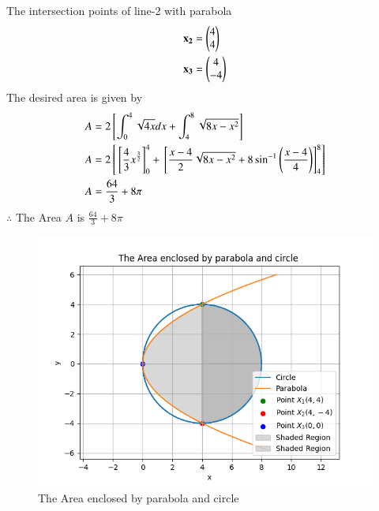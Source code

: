 \documentclass[journal]{IEEEtran}
\begin{document}
The intersection points of line-2 with parabola 
\begin{align}
\mathbf{x_2} &= \begin{pmatrix}4\\4\end{pmatrix}\\
\mathbf{x_3} &= \begin{pmatrix}4\\-4\end{pmatrix}
\end{align}
The desired area is given by 
\begin{align}
    A &= 2{}\left[\int_{0}^{4}\sqrt{4x}dx + \int_{4}^{8}\sqrt{8x - x^2} \right] \\
    A &= 2{}\left[{}\left[\frac{4}{3} x^{\frac{3}{2}}\right]_{0}^{4} + {}\left[\frac{x-4}{2}\sqrt{8x - x^2} + 8 \sin^{-1}\left(\frac{x-4}{4}\right)\right]_4^8 \right]\\
     A &= \frac{64}{3}+ 8 \pi
\end{align}
$\therefore$ The Area $A$ is $\frac{64}{3} + 8\pi$
\begin{figure}[h!]
   \centering
   \includegraphics[width = .8\linewidth]{figs/fig.png}
   \caption{The Area enclosed by parabola and circle}
   \label{stemplot}
   \end{figure}
\end{document}
